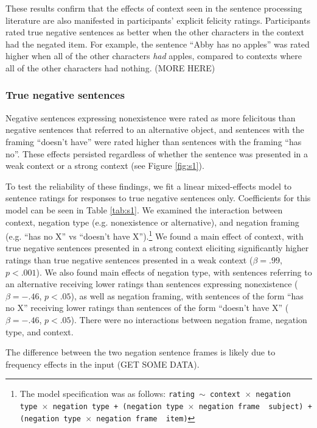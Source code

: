 \documentclass[10pt,letterpaper]{article}
\begin{document}
These results confirm that the effects of context seen in the sentence processing literature are also manifested in participants' explicit felicity ratings.  Participants rated true negative sentences as better when the other characters in the context had the negated item.  For example, the sentence ``Abby has no apples'' was rated higher when all of the other characters \emph{had} apples, compared to contexts where all of the other characters had nothing.  (MORE HERE)

\subsubsection{True negative sentences}

Negative sentences expressing nonexistence were rated as more felicitous than negative sentences that referred to an alternative object, and sentences with the framing ``doesn't have'' were rated higher than sentences with the framing ``has no''.  These effects persisted regardless of whether the sentence was presented in a weak context or a strong context (see Figure \ref{fig:s1}).  

To test the reliability of these findings, we fit a linear mixed-effects model to sentence ratings for responses to true negative sentences only.  Coefficients for this model can be seen in Table \ref{tab:s1}.  We examined the interaction between context, negation type (e.g. nonexistence or alternative), and negation framing (e.g. ``has no X'' vs ``doesn't have X'').\footnote{ The model specification was as follows: \texttt{rating $\sim$ context~$\times$~negation type~$\times$~negation type + (negation type~$\times$~negation frame~\textbar~subject) +  (negation type~$\times$~negation frame~\textbar~item)}} We found a main effect of context, with true negative sentences presented in a strong context eliciting significantly higher ratings than true negative sentences presented in a weak context ($\beta= .99$, $p< .001$).  We also found main effects of negation type, with sentences referring to an alternative receiving lower ratings than sentences expressing nonexistence ($\beta= -.46$, $p< .05$), as well as negation framing, with sentences of the form ``has no X'' receiving lower ratings than sentences of the form ``doesn't have X''  ($\beta= -.46$, $p< .05$).  There were no interactions between negation frame, negation type, and context.  

The difference between the two negation sentence frames is likely due to frequency effects in the input (GET SOME DATA). 
\end{document}
